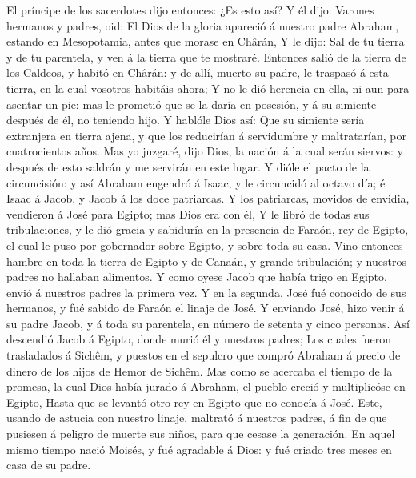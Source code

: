  El príncipe de los sacerdotes dijo entonces: ¿Es esto así?
 Y él dijo: Varones hermanos y padres, oid: El Dios de la
gloria apareció á nuestro padre Abraham, estando en Mesopotamia, antes
que morase en Chârán,  Y le dijo: Sal de tu tierra y de tu
parentela, y ven á la tierra que te mostraré.  Entonces
salió de la tierra de los Caldeos, y habitó en Chârán: y de allí, muerto
su padre, le traspasó á esta tierra, en la cual vosotros habitáis ahora;
 Y no le dió herencia en ella, ni aun para asentar un pie:
mas le prometió que se la daría en posesión, y á su simiente después de
él, no teniendo hijo.  Y hablóle Dios así: Que su simiente
sería extranjera en tierra ajena, y que los reducirían á servidumbre y
maltratarían, por cuatrocientos años.  Mas yo juzgaré, dijo
Dios, la nación á la cual serán siervos: y después de esto saldrán y me
servirán en este lugar.  Y dióle el pacto de la
circuncisión: y así Abraham engendró á Isaac, y le circuncidó al octavo
día; é Isaac á Jacob, y Jacob á los doce patriarcas.  Y los
patriarcas, movidos de envidia, vendieron á José para Egipto; mas Dios
era con él,  Y le libró de todas sus tribulaciones, y le
dió gracia y sabiduría en la presencia de Faraón, rey de Egipto, el cual
le puso por gobernador sobre Egipto, y sobre toda su casa. 
Vino entonces hambre en toda la tierra de Egipto y de Canaán, y grande
tribulación; y nuestros padres no hallaban alimentos.  Y
como oyese Jacob que había trigo en Egipto, envió á nuestros padres la
primera vez.  Y en la segunda, José fué conocido de sus
hermanos, y fué sabido de Faraón el linaje de José.  Y
enviando José, hizo venir á su padre Jacob, y á toda su parentela, en
número de setenta y cinco personas.  Así descendió Jacob á
Egipto, donde murió él y nuestros padres;  Los cuales
fueron trasladados á Sichêm, y puestos en el sepulcro que compró Abraham
á precio de dinero de los hijos de Hemor de Sichêm.  Mas
como se acercaba el tiempo de la promesa, la cual Dios había jurado á
Abraham, el pueblo creció y multiplicóse en Egipto,  Hasta
que se levantó otro rey en Egipto que no conocía á José. 
Este, usando de astucia con nuestro linaje, maltrató á nuestros padres,
á fin de que pusiesen á peligro de muerte sus niños, para que cesase la
generación.  En aquel mismo tiempo nació Moisés, y fué
agradable á Dios: y fué criado tres meses en casa de su padre.
